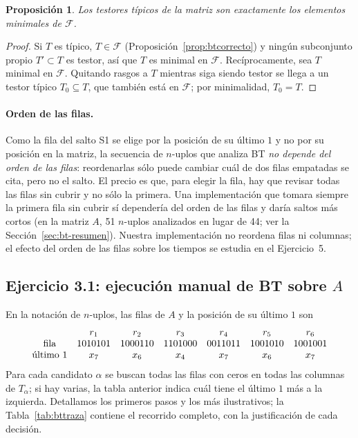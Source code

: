 \documentclass[11pt, a4paper]{article}
\theoremstyle{definition}
\theoremstyle{plain}
\newtheorem{proposicion}{Proposición}
\newcommand{\x}[1]{x_{#1}}
\begin{document}
\begin{proposicion}\label{prop:minimales}
Los testores típicos de la matriz son exactamente los elementos minimales de $\mathcal F$.
\end{proposicion}
\begin{proof}
Si $T$ es típico, $T\in\mathcal F$ (Proposición~\ref{prop:btcorrecto}) y ningún
subconjunto propio $T'\subset T$ es testor, así que $T$ es minimal en $\mathcal F$. Recíprocamente, sea
$T$ minimal en $\mathcal F$. Quitando rasgos a $T$ mientras siga siendo testor se llega
a un testor típico $T_0\subseteq T$, que también está en $\mathcal F$; por minimalidad,
$T_0=T$.
\end{proof}

\paragraph{Orden de las filas.} Como la fila del salto S1 se elige por la
posición de su último $1$ y no por su posición en la matriz, la secuencia de
$n$-uplos que analiza BT \emph{no depende del orden de las filas}: reordenarlas
sólo puede cambiar cuál de dos filas empatadas se cita, pero no el salto. El
precio es que, para elegir la fila, hay que revisar todas las filas sin
cubrir y no sólo la primera. Una implementación que tomara siempre la primera
fila sin cubrir sí dependería del orden de las filas y daría saltos más cortos
(en la matriz $A$, 51 $n$-uplos analizados en lugar de 44; ver la
Sección~\ref{sec:bt-resumen}). Nuestra implementación no reordena filas ni
columnas; el efecto del orden de las filas sobre los tiempos se estudia en el
Ejercicio~5.

\subsection{Ejercicio 3.1: ejecución manual de BT sobre $A$}

En la notación de $n$-uplos, las filas de $A$ y la posición de su último $1$ son
\[
\begin{array}{c c c c c c c}
 & r_1 & r_2 & r_3 & r_4 & r_5 & r_6\\
\text{fila} & 1010101 & 1000110 & 1101000 & 0011011 & 1001010 & 1001001\\
\text{último 1} & \x7 & \x6 & \x4 & \x7 & \x6 & \x7
\end{array}
\]
Para cada candidato $\alpha$ se buscan todas las filas con ceros en todas las
columnas de $T_\alpha$; si hay varias, la tabla anterior indica cuál tiene el
último $1$ más a la izquierda. Detallamos los primeros pasos y los más
ilustrativos; la Tabla~\ref{tab:bttraza} contiene el recorrido completo, con
la justificación de cada decisión.
\end{document}
